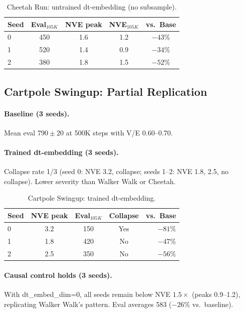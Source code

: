\documentclass[10pt,twocolumn]{article}
\begin{document}
\begin{table}[h]
\centering
\caption{Cheetah Run: untrained dt-embedding (no subsample).}
\label{tab:cheetah-untrained}
\begin{tabular}{lcccc}
\toprule
Seed & Eval$_{105K}$ & NVE peak & NVE$_{105K}$ & vs.\ Base \\
\midrule
0 & 450 & 1.6 & 1.2 & $-43\%$ \\
1 & 520 & 1.4 & 0.9 & $-34\%$ \\
2 & 380 & 1.8 & 1.5 & $-52\%$ \\
\bottomrule
\end{tabular}
\end{table}

\subsection{Cartpole Swingup: Partial Replication}
\label{sec:cartpole}

\paragraph{Baseline (3 seeds).} Mean eval $790 \pm 20$ at 500K steps with V/E 0.60--0.70.

\paragraph{Trained dt-embedding (3 seeds).} Collapse rate 1/3 (seed 0: NVE 3.2, collapse; seeds 1--2: NVE 1.8, 2.5, no collapse). Lower severity than Walker Walk or Cheetah.

\begin{table}[h]
\centering
\caption{Cartpole Swingup: trained dt-embedding.}
\label{tab:cartpole-civo}
\begin{tabular}{lcccr}
\toprule
Seed & NVE peak & Eval$_{105K}$ & Collapse & vs.\ Base \\
\midrule
0 & 3.2 & 150 & Yes & $-81\%$ \\
1 & 1.8 & 420 & No & $-47\%$ \\
2 & 2.5 & 350 & No & $-56\%$ \\
\bottomrule
\end{tabular}
\end{table}

\paragraph{Causal control holds (3 seeds).} With dt\_embed\_dim=0, all seeds remain below NVE $1.5\times$ (peaks 0.9--1.2), replicating Walker Walk's pattern. Eval averages 583 ($-26\%$ vs.\ baseline).
\end{document}
